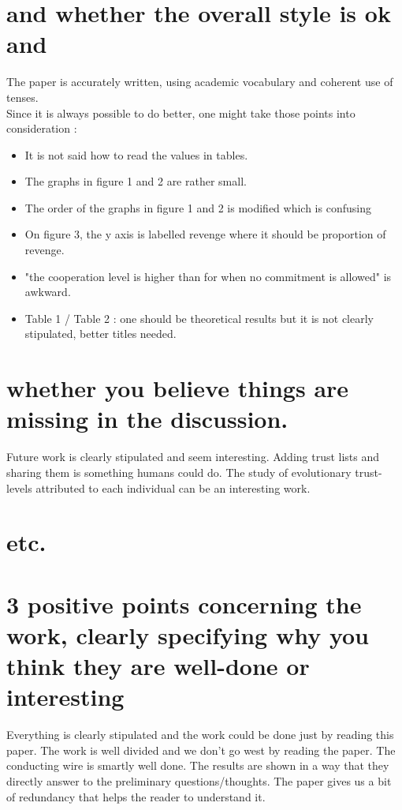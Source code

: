 \documentclass{article}
\begin{document}
\section{and whether the overall style is ok and}
The paper is accurately written, using academic vocabulary and coherent use of tenses.\\
Since it is always possible to do better, one might take those points into consideration :
\begin{itemize}
\item It is not said how to read the values in tables.
\item The graphs in figure 1 and 2 are rather small.
\item The order of the graphs in figure 1 and 2 is modified which is confusing
\item On figure 3, the y axis is labelled revenge where it should be proportion of revenge. 
\item "the cooperation level is higher than for when no commitment is allowed" is awkward.
\item Table 1 / Table 2 : one should be theoretical results but it is not clearly stipulated, better titles needed. 
\end{itemize}


\section{whether you believe things are missing in the discussion.}

Future work is clearly stipulated and seem interesting. Adding trust lists and sharing them is something humans could do.
The study of evolutionary trust-levels attributed to each individual can be an interesting work.


\section{etc.}


\section{3 positive points concerning the work, clearly specifying why you think they are well-done or interesting}

Everything is clearly stipulated and the work could be done just by reading this paper. 
The work is well divided and we don't go west by reading the paper. The conducting wire is smartly well done.
The results are shown in a way that they directly answer to the preliminary questions/thoughts.
The paper gives us a bit of redundancy that helps the reader to understand it.
\end{document}
